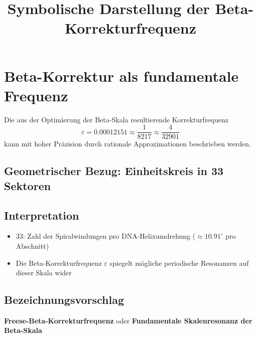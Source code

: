 \documentclass{article}
\title{Symbolische Darstellung der Beta-Korrekturfrequenz}
\author{}
\date{}
\begin{document}
\maketitle

\section*{Beta-Korrektur als fundamentale Frequenz}

Die aus der Optimierung der Beta-Skala resultierende Korrekturfrequenz
\[
\varepsilon = 0.00012151 \approx \frac{1}{8217} \approx \frac{4}{32901}
\]
kann mit hoher Präzision durch rationale Approximationen beschrieben werden.

\subsection*{Geometrischer Bezug: Einheitskreis in 33 Sektoren}

\begin{center}
\end{center}

\subsection*{Interpretation}

\begin{itemize}
    \item $33$: Zahl der Spiralwindungen pro DNA-Helixumdrehung ($\approx 10.91^{\circ}$ pro Abschnitt)
    \item Die Beta-Korrekturfrequenz $\varepsilon$ spiegelt mögliche periodische Resonanzen auf dieser Skala wider
\end{itemize}

\subsection*{Bezeichnungsvorschlag}

\textbf{Freese-Beta-Korrekturfrequenz} oder \textbf{Fundamentale Skalenresonanz der Beta-Skala}
\end{document}
